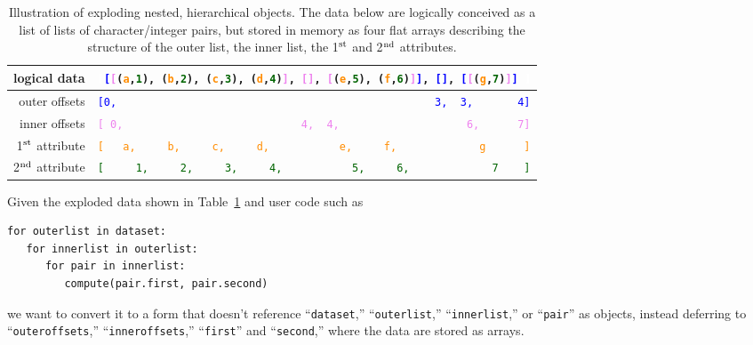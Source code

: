 \documentclass[a4paper]{jpconf}
\begin{document}
\begin{table}
\caption{\label{tab:exploding} Illustration of exploding nested, hierarchical objects. The data below are logically conceived as a list of lists of character/integer pairs, but stored in memory as four flat arrays describing the structure of the outer list, the inner list, the 1$^{\mbox{\scriptsize st}}$ and 2$^{\mbox{\scriptsize nd}}$ attributes.}

\begin{center}
\begin{tabular}{r l}
logical data & {\tt\small \textcolor{white}{[}\textcolor{blue}{[}\textcolor{violet}{[}(\textcolor{darkorange}{a},\textcolor{darkgreen}{1}), (\textcolor{darkorange}{b},\textcolor{darkgreen}{2}), (\textcolor{darkorange}{c},\textcolor{darkgreen}{3}), (\textcolor{darkorange}{d},\textcolor{darkgreen}{4})\textcolor{violet}{]}, \textcolor{violet}{[]}, \textcolor{violet}{[}(\textcolor{darkorange}{e},\textcolor{darkgreen}{5}), (\textcolor{darkorange}{f},\textcolor{darkgreen}{6})\textcolor{violet}{]}\textcolor{blue}{]}, \textcolor{blue}{[]}, \textcolor{blue}{[}\textcolor{violet}{[}(\textcolor{darkorange}{g},\textcolor{darkgreen}{7})\textcolor{violet}{]}\textcolor{blue}{]}\ \textcolor{white}{]}} \\\hline
outer offsets & {\tt\small \textcolor{blue}{[0,\ \ \ \ \ \ \ \ \ \ \ \ \ \ \ \ \ \ \ \ \ \ \ \ \ \ \ \ \ \ \ \ \ \ \ \ \ \ \ \ \ \ \ \ \ \ \ \ \ \ 3,\ \ 3,\ \ \ \ \ \ \ 4]}} \\
inner offsets & {\tt\small \textcolor{violet}{[\ 0,\ \ \ \ \ \ \ \ \ \ \ \ \ \ \ \ \ \ \ \ \ \ \ \ \ \ \ \ 4,\ \ 4,\ \ \ \ \ \ \ \ \ \ \ \ \ \ \ \ \ \ \ \ 6,\ \ \ \ \ \ 7]}} \\
1$^{\mbox{\scriptsize st}}$ attribute & {\tt\small \textcolor{darkorange}{[\ \ \ a,\ \ \ \ \ b,\ \ \ \ \ c,\ \ \ \ \ d,\ \ \ \ \ \ \ \ \ \ \ e,\ \ \ \ \ f,\ \ \ \ \ \ \ \ \ \ \ \ \ g\ \ \ \ \ \ ]}} \\
2$^{\mbox{\scriptsize nd}}$ attribute & {\tt\small \textcolor{darkgreen}{[\ \ \ \ \ 1,\ \ \ \ \ 2,\ \ \ \ \ 3,\ \ \ \ \ 4,\ \ \ \ \ \ \ \ \ \ \ 5,\ \ \ \ \ 6,\ \ \ \ \ \ \ \ \ \ \ \ \ 7\ \ \ \ ]}}
\end{tabular}
\end{center}
\vspace{-0.75 cm}
\end{table}

Given the exploded data shown in Table~\ref{tab:exploding} and user code such as
\begin{center}
\begin{minipage}{0.7\linewidth}
\begin{verbatim}
for outerlist in dataset:
   for innerlist in outerlist:
      for pair in innerlist:
         compute(pair.first, pair.second)
\end{verbatim}
\end{minipage}
\end{center}
we want to convert it to a form that doesn't reference ``{\tt dataset},'' ``{\tt outerlist},'' ``{\tt innerlist},'' or ``{\tt pair}'' as objects, instead deferring to ``{\tt outeroffsets},'' ``{\tt inneroffsets},'' ``{\tt first}'' and ``{\tt second},'' where the data are stored as arrays.
\end{document}
